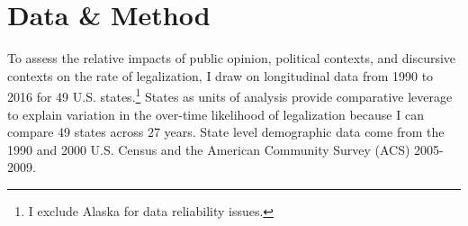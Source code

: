 
\section{Data \& Method}

To assess the relative impacts of public opinion, political contexts, and discursive contexts on the rate of legalization, I draw on longitudinal data from 1990 to 2016 for 49 U.S. states.\footnote{I exclude Alaska for data reliability issues.} %
States as units of analysis provide comparative leverage to explain variation in the over-time likelihood of legalization because I can compare 49 states across 27 years. %
State level demographic data come from the 1990 and 2000 U.S. Census and the American Community Survey (ACS) 2005-2009. %

